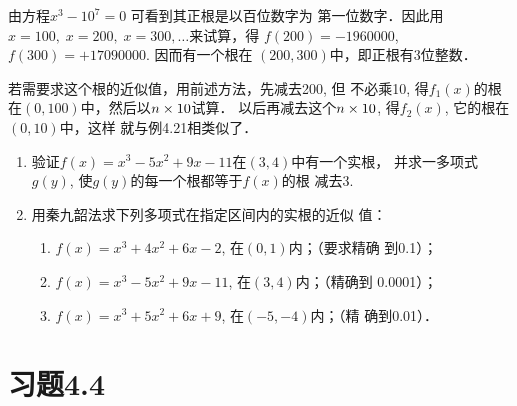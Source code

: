 \begin{solution}
由方程$x^3-10^7=0$ 可看到其正根是以百位数字为
第一位数字．因此用$x=100,\; x=200,\; x=300,\ldots$来试算，得
$f(200)=-1960000$, $f(300)=+17090000$. 因而有一个根在
$(200,300)$中，即正根有3位整数．

若需要求这个根的近似值，用前述方法，先减去200, 但
不必乘10, 得$f_1(x)$的根在$(0,100)$中，然后以$n\times10$试算．
以后再减去这个$n\times10$, 得$f_2(x)$, 它的根在$(0,10)$中，这样
就与例4.21相类似了．
\end{solution}

\begin{ex}
\begin{enumerate}
    \item 验证$f(x)=x^3-5x^2+9x-11$在$(3,4)$中有一个实根，
    并求一多项式$g(y)$, 使$g(y)$的每一个根都等于$f(x)$的根
    减去3.
    \item 用秦九韶法求下列多项式在指定区间内的实根的近似
    值：
    \begin{enumerate}
    \item $f(x)=x^3+4x^2+6x-2$, 在$(0,1)$内；（要求精确
    到0.1）；
    \item $f(x)=x^3-5x^2+9x-11$, 在$(3,4)$内；（精确到
    0.0001）；
    \item $f(x)=x^3+5x^2+6x+9$, 在$(-5,-4)$内；（精
    确到0.01）．        
    \end{enumerate}
\end{enumerate}
\end{ex}

\section*{习题4.4}


